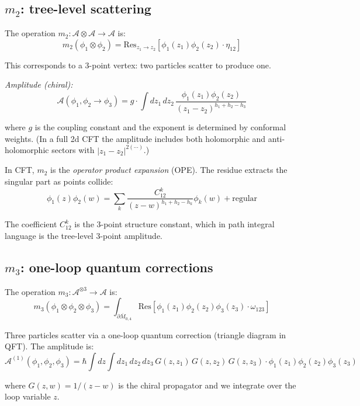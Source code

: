 \subsection{\texorpdfstring{$m_2$: tree-level scattering}{m 2: tree-level scattering}}

\begin{example}[Binary product = classical OPE]
\label{ex:m2-tree-level}
The operation $m_2: \mathcal{A} \otimes \mathcal{A} \to \mathcal{A}$ is:
\[m_2(\phi_1 \otimes \phi_2) = \text{Res}_{z_1 \to z_2}[\phi_1(z_1)\phi_2(z_2) \cdot 
\eta_{12}]\]

This corresponds to a 3-point vertex: two particles scatter to produce one.

\emph{Amplitude (chiral):}
\[\mathcal{A}(\phi_1, \phi_2 \to \phi_3) = g \cdot \int dz_1\, dz_2 \,
\frac{\phi_1(z_1)\phi_2(z_2)}{(z_1-z_2)^{h_1+h_2-h_3}}\]

where $g$ is the coupling constant and the exponent is determined by conformal weights.  (In a full 2d CFT the amplitude includes both holomorphic and anti-holomorphic sectors with $|z_1-z_2|^{2(\cdots)}$.)
\end{example}

\begin{remark}\label{rem:witten-m2}
In CFT, $m_2$ is the \emph{operator product expansion} (OPE). The residue extracts 
the singular part as points collide:
\[\phi_1(z)\phi_2(w) = \sum_k \frac{C_{12}^k}{(z-w)^{h_1+h_2-h_k}} \phi_k(w) + 
\text{regular}\]

The coefficient $C_{12}^k$ is the 3-point structure constant, which in path integral 
language is the tree-level 3-point amplitude.
\end{remark}

\subsection{\texorpdfstring{$m_3$: one-loop quantum corrections}{m 3: one-loop quantum corrections}}

\begin{example}[Ternary operation = triangle diagram]
\label{ex:m3-one-loop}
The operation $m_3: \mathcal{A}^{\otimes 3} \to \mathcal{A}$ is:
\[m_3(\phi_1 \otimes \phi_2 \otimes \phi_3) = \int_{\partial\overline{M}_{0,4}} 
\text{Res}[\phi_1(z_1)\phi_2(z_2)\phi_3(z_3) \cdot \omega_{123}]\]

Three particles scatter via a one-loop quantum correction
(triangle diagram in QFT).  The amplitude is:
\[\mathcal{A}^{(1)}(\phi_1,\phi_2,\phi_3) = \hbar \int dz \int dz_1\, dz_2\, dz_3
\, G(z,z_1)\,G(z,z_2)\,G(z,z_3) \cdot \phi_1(z_1)\phi_2(z_2)\phi_3(z_3)\]

where $G(z,w) = 1/(z-w)$ is the chiral propagator and we integrate over the loop variable $z$.
\end{example}

